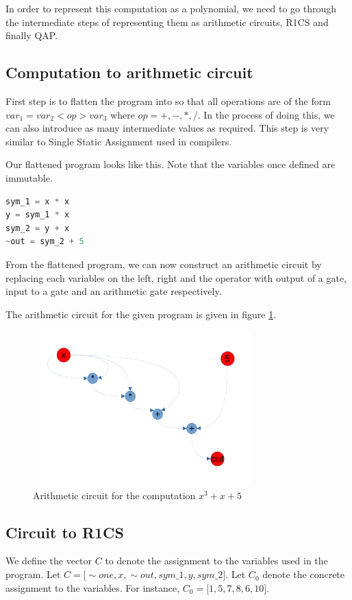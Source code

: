 \documentclass[twoside]{article}
\begin{document}
In order to represent this computation as a polynomial, we need to go through the intermediate steps of representing them as
arithmetic circuits, R1CS and finally QAP.

\subsection{Computation to arithmetic circuit}
First step is to flatten the program into so that all operations are of the form $var_1 = var_2 <op> var_3$ where $op = +, -, *, /$.
In the process of doing this, we can also introduce as many intermediate values as required. This step is very similar to 
Single Static Assignment used in compilers.

Our flattened program looks like this. Note that the variables once defined are immutable.

\begin{lstlisting}[language=Python]
sym_1 = x * x
y = sym_1 * x
sym_2 = y + x
~out = sym_2 + 5
\end{lstlisting}

From the flattened program, we can now construct an arithmetic circuit by replacing each variables on the left, right and the operator with
output of a gate, input to a gate and an arithmetic gate respectively.

The arithmetic circuit for the given program is given in figure \ref{f:circuit}.

\begin{figure}
\centering
\includegraphics[width=0.75\textwidth]{lecture12-circuit.pdf}
\caption{Arithmetic circuit for the computation $x^3 + x + 5$}
\label{f:circuit}
\end{figure}




\subsection{Circuit to R1CS}
We define the vector $C$ to denote the assignment to the variables used in the program. 
Let $C = \lbrack \sim one, x, \sim out, sym\text{\_}1, y, sym\text{\_}2 \rbrack$.
Let $C_0$ denote the concrete assignment to the variables. For instance, $C_0 = \lbrack 1, 5, 7, 8, 6, 10\rbrack$.
\end{document}
